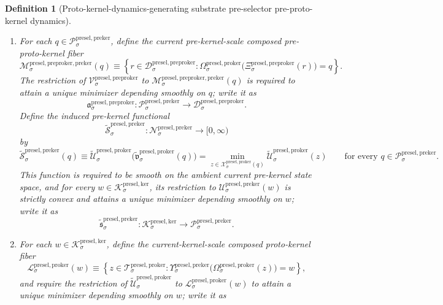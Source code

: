 \documentclass[11pt]{article}
\newcommand{\KernelBody}[1]{\mathcal K_{#1}^{\mathrm{presel,ker}}}
\newcommand{\PreKernelSpace}[1]{\mathcal N_{#1}^{\mathrm{presel,preker}}}
\newcommand{\PreKernelBody}[1]{\mathcal P_{#1}^{\mathrm{presel,preker}}}
\newcommand{\PreKernelProj}[1]{\Upsilon_{#1}^{\mathrm{presel,preker}}}
\newcommand{\PreKernelFiber}[2]{\mathcal U_{#1}^{\mathrm{presel,preker}}(#2)}
\newcommand{\ProtoKernelBody}[1]{\mathcal T_{#1}^{\mathrm{presel,proker}}}
\newcommand{\ProtoKernelProj}[1]{\Omega_{#1}^{\mathrm{presel,proker}}}
\newcommand{\ProtoKernelFiber}[2]{\mathcal X_{#1}^{\mathrm{presel,proker}}(#2)}
\newcommand{\ProtoKernelKernelFiber}[2]{\mathcal L_{#1}^{\mathrm{presel,proker}}(#2)}
\newcommand{\PreProtoKernelBody}[1]{\mathcal D_{#1}^{\mathrm{presel,preproker}}}
\newcommand{\PreProtoKernelProj}[1]{\Xi_{#1}^{\mathrm{presel,preproker}}}
\newcommand{\PreProtoKernelFiber}[2]{\mathcal B_{#1}^{\mathrm{presel,preproker}}(#2)}
\newcommand{\PreProtoKernelFunctional}[1]{\mathscr V_{#1}^{\mathrm{presel,preproker}}}
\newcommand{\PreProtoKernelMinLift}[1]{\mathfrak z_{#1}^{\mathrm{presel,preproker}}}
\newcommand{\PreProtoKernelPreKernelFiber}[2]{\mathcal M_{#1}^{\mathrm{presel,preproker,preker}}(#2)}
\newcommand{\PreProtoKernelPreKernelMin}[1]{\mathfrak a_{#1}^{\mathrm{presel,preproker}}}
\newcommand{\InducedPreKernelFunctional}[1]{\widetilde{\mathscr S}_{#1}^{\mathrm{presel,preker}}}
\newcommand{\InducedPreKernelMinLift}[1]{\widetilde{\mathfrak s}_{#1}^{\mathrm{presel,preker}}}
\newcommand{\InducedProtoKernelFunctional}[1]{\widetilde{\mathscr U}_{#1}^{\mathrm{presel,proker}}}
\newcommand{\InducedProtoKernelMinLift}[1]{\widetilde{\mathfrak v}_{#1}^{\mathrm{presel,proker}}}
\newtheorem{definition}{Definition}
\begin{document}
\begin{definition}[Proto-kernel-dynamics-generating substrate pre-selector pre-proto-kernel dynamics]
\begin{enumerate}
\[    \equiv
    \PreProtoKernelFunctional{\sigma}\bigl(\PreProtoKernelMinLift{\sigma}(z)\bigr)
    =
    \min_{r\in\PreProtoKernelFiber{\sigma}{z}}
    \PreProtoKernelFunctional{\sigma}(r)
    \qquad
    \text{for every }
    z\in\ProtoKernelBody{\sigma}.
    \]
    Moreover, for every \(q\in\PreKernelBody{\sigma}\), the restriction of \(\InducedProtoKernelFunctional{\sigma}\) to \(\ProtoKernelFiber{\sigma}{q}\) is strictly convex and attains a unique minimizer depending smoothly on \(q\); write it as
    \[
    \InducedProtoKernelMinLift{\sigma}:\PreKernelBody{\sigma}\to\ProtoKernelBody{\sigma}.
    \]
    \item For each \(q\in\PreKernelBody{\sigma}\), define the current pre-kernel-scale composed pre-proto-kernel fiber
    \[
    \PreProtoKernelPreKernelFiber{\sigma}{q}
    \equiv
    \left\{
    r\in\PreProtoKernelBody{\sigma}:
    \ProtoKernelProj{\sigma}\bigl(\PreProtoKernelProj{\sigma}(r)\bigr)=q
    \right\}.
    \]
    The restriction of \(\PreProtoKernelFunctional{\sigma}\) to \(\PreProtoKernelPreKernelFiber{\sigma}{q}\) is required to attain a unique minimizer depending smoothly on \(q\); write it as
    \[
    \PreProtoKernelPreKernelMin{\sigma}:\PreKernelBody{\sigma}\to\PreProtoKernelBody{\sigma}.
    \]
    Define the induced pre-kernel functional
    \[
    \InducedPreKernelFunctional{\sigma}:\PreKernelSpace{\sigma}\to[0,\infty)
    \]
    by
    \[
    \InducedPreKernelFunctional{\sigma}(q)
    \equiv
    \InducedProtoKernelFunctional{\sigma}\bigl(\InducedProtoKernelMinLift{\sigma}(q)\bigr)
    =
    \min_{z\in\ProtoKernelFiber{\sigma}{q}}
    \InducedProtoKernelFunctional{\sigma}(z)
    \qquad
    \text{for every }
    q\in\PreKernelBody{\sigma}.
    \]
    This function is required to be smooth on the ambient current pre-kernel state space, and for every \(w\in\KernelBody{\sigma}\), its restriction to \(\PreKernelFiber{\sigma}{w}\) is strictly convex and attains a unique minimizer depending smoothly on \(w\); write it as
    \[
    \InducedPreKernelMinLift{\sigma}:\KernelBody{\sigma}\to\PreKernelBody{\sigma}.
    \]
    \item For each \(w\in\KernelBody{\sigma}\), define the current-kernel-scale composed proto-kernel fiber
    \[
    \ProtoKernelKernelFiber{\sigma}{w}
    \equiv
    \left\{
    z\in\ProtoKernelBody{\sigma}:
    \PreKernelProj{\sigma}\bigl(\ProtoKernelProj{\sigma}(z)\bigr)=w
    \right\},
    \]
    and require the restriction of \(\InducedProtoKernelFunctional{\sigma}\) to \(\ProtoKernelKernelFiber{\sigma}{w}\) to attain a unique minimizer depending smoothly on \(w\); write it as

\end{enumerate}
\end{definition}
\end{document}
